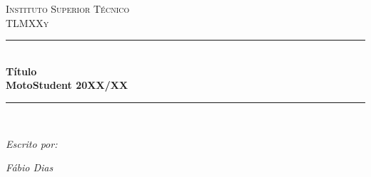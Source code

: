 \begin{titlepage}

\newcommand{\HRule}{\rule{\linewidth}{0.5mm}} %

\center %
\vspace*{1cm} 

\textsc{\LARGE Instituto Superior Técnico}\\[1.5cm] %
\textsc{\Large  TLMXXy}\\[0.5cm] %


\HRule \\[0.4cm]
{ \LARGE \bfseries Título}\\[0.4cm] %
{ \large \bfseries MotoStudent 20XX/XX}\\[0.4cm] %
\HRule \\[1.5cm]
 

\begin{minipage}{0.4\textwidth}
\begin{flushleft} \large
\emph{Escrito por:}
\par
\textit{Fábio Dias}\\

 \textsc{}


\end{flushleft}
\end{minipage}
\begin{minipage}{0.4\textwidth}
\begin{flushright} \large
\end{flushright}
\end{minipage}\\[3cm]


\end{titlepage}
